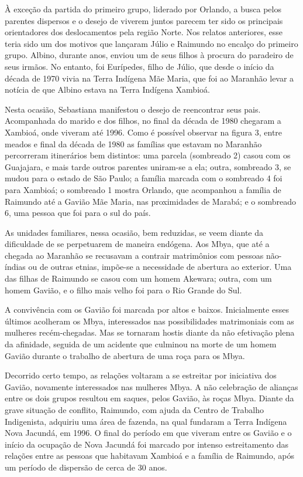 À exceção da partida do primeiro grupo, liderado por Orlando, a busca
pelos parentes dispersos e o desejo de viverem juntos parecem ter sido
os principais orientadores dos deslocamentos pela região Norte. Nos
relatos anteriores, esse teria sido um dos motivos que lançaram Júlio e
Raimundo no encalço do primeiro grupo. Albino, durante anos, enviou um
de seus filhos à procura do paradeiro de seus irmãos. No entanto, foi
Eurípedes, filho de Júlio, que desde o início da década de 1970 vivia na
Terra Indígena Mãe Maria, que foi ao Maranhão levar a notícia de que
Albino estava na Terra Indígena Xambioá.

Nesta ocasião, Sebastiana manifestou o desejo de reencontrar seus pais.
Acompanhada do marido e dos filhos, no final da década de 1980 chegaram
a Xambioá, onde viveram até 1996. Como é possível observar na figura 3,
entre meados e final da década de 1980 as famílias que estavam no
Maranhão percorreram itinerários bem distintos: uma parcela (sombreado
2) casou com os Guajajara, e mais tarde outros parentes uniram-se a ela; 
outra, sombreado 3, se mudou para o estado de São Paulo; a
família marcada com o sombreado 4 foi para Xambioá; o sombreado 1
mostra Orlando, que acompanhou a família de Raimundo até a  Gavião
Mãe Maria, nas proximidades de Marabá; e o sombreado 6, uma pessoa que
foi para o sul do país.

As unidades familiares, nessa ocasião, bem reduzidas, se veem diante da
dificuldade de se perpetuarem de maneira endógena. Aos Mbya, que até a
chegada ao Maranhão se recusavam a contrair matrimônios com pessoas
não-índias ou de outras etnias, impõe-se a necessidade de abertura ao
exterior. Uma das filhas de Raimundo se casou com um homem Akewara;
outra, com um homem Gavião, e o filho mais velho foi para o Rio Grande
do Sul. 

A convivência com os Gavião foi marcada por altos e baixos. Inicialmente
esses últimos acolheram os Mbya, interessados nas possibilidades
matrimoniais com as mulheres recém-chegadas. Mas se tornaram hostis
diante da não efetivação plena da afinidade, seguida de um acidente que
culminou na morte de um homem Gavião durante o trabalho de abertura de
uma roça para os Mbya.

Decorrido certo tempo, as relações voltaram a se estreitar por
iniciativa dos Gavião, novamente interessados nas mulheres Mbya. A não
celebração de alianças entre os dois grupos resultou em saques, pelos
Gavião, às roças Mbya. Diante da grave situação de conflito, Raimundo,
com ajuda da  Centro de Trabalho Indigenista, adquiriu uma área de
fazenda, na qual fundaram a Terra Indígena Nova Jacundá, em 1996. O
final do período em que viveram entre os Gavião e o início da ocupação
de Nova Jacundá foi marcado por intenso estreitamento das relações
entre as pessoas que habitavam Xambioá e a família de Raimundo, após um
período de dispersão de cerca de 30 anos.

